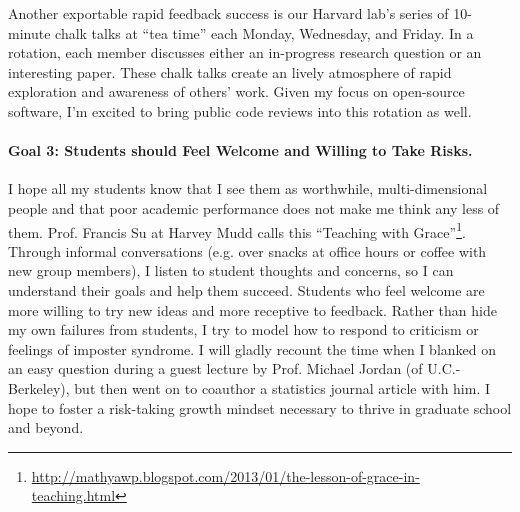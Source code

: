 \documentclass[11pt,letterpaper]{article}
\begin{document}

Another exportable rapid feedback success is our Harvard lab's series of 10-minute chalk talks at ``tea time'' each Monday, Wednesday, and Friday. In a rotation, each member discusses either an in-progress research question or an interesting paper. 
These chalk talks create an lively atmosphere of rapid exploration and awareness of others' work. Given my focus on open-source software, I'm excited to bring public code reviews into this rotation as well. 

\paragraph{Goal 3: Students should Feel Welcome and Willing to Take Risks.}
I hope all my students know that I see them as worthwhile, multi-dimensional people and that poor academic performance does not make me think any less of them.
Prof. Francis Su at Harvey Mudd calls this ``Teaching with Grace''\footnote{\url{http://mathyawp.blogspot.com/2013/01/the-lesson-of-grace-in-teaching.html}}. 
Through informal conversations (e.g. over snacks at office hours or coffee with new group members), I listen to student thoughts and concerns, so I can understand their goals and help them succeed.
Students who feel welcome are more willing to try new ideas and more receptive to feedback.
Rather than hide my own failures from students, I try to 
model how to respond to criticism or feelings of imposter syndrome. I will gladly recount the time when I blanked on an easy question during a guest lecture by Prof. Michael Jordan (of U.C.-Berkeley), but then went on to coauthor a statistics journal article with him.
I hope to foster a risk-taking growth mindset necessary to thrive in graduate school and beyond.
\end{document}
